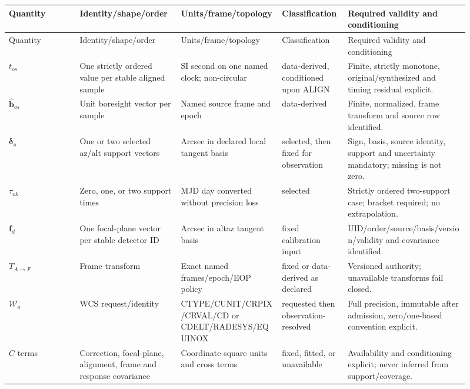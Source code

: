 \documentclass[11pt]{article}
\newcommand{\breakslash}{/\allowbreak}
\begin{document}
\begin{longtable}{L{0.14\linewidth}L{0.20\linewidth}L{0.20\linewidth}L{0.13\linewidth}L{0.24\linewidth}}
\toprule
Quantity & Identity/shape/order & Units/frame/topology & Classification & Required validity and conditioning \\
\midrule
\endfirsthead
\toprule
Quantity & Identity/shape/order & Units/frame/topology & Classification & Required validity and conditioning \\
\midrule
\endhead
$t_{os}$ & One strictly ordered value per stable aligned sample & SI second on one named clock; non-circular & data-derived, conditioned upon ALIGN & Finite, strictly monotone, original/synthesized and timing residual explicit. \\
$\widehat{\boldsymbol b}_{os}$ & Unit boresight vector per sample & Named source frame and epoch & data-derived & Finite, normalized, frame transform and source row identified. \\
$\boldsymbol\delta_o$ & One or two selected az/alt support vectors & Arcsec in declared local tangent basis & selected, then fixed for observation & Sign, basis, source identity, support and uncertainty mandatory; missing is not zero. \\
$\tau_{ok}$ & Zero, one, or two support times & MJD day converted without precision loss & selected & Strictly ordered two-support case; bracket required; no extrapolation. \\
$\boldsymbol f_d$ & One focal-plane vector per stable detector ID & Arcsec in altaz tangent basis & fixed calibration input & UID\breakslash order\breakslash source\breakslash basis\breakslash version\breakslash validity and covariance identified. \\
$T_{A\to F}$ & Frame transform & Exact named frames\breakslash epoch\breakslash EOP policy & fixed or data-derived as declared & Versioned authority; unavailable transforms fail closed. \\
$\mathcal W_o$ & WCS request/identity & CTYPE\breakslash CUNIT\breakslash CRPIX\breakslash CRVAL\breakslash CD or CDELT\breakslash RADESYS\breakslash EQUINOX & requested then observation-resolved & Full precision, immutable after admission, zero/one-based convention explicit. \\
$C$ terms & Correction, focal-plane, alignment, frame and response covariance & Coordinate-square units and cross terms & fixed, fitted, or unavailable & Availability and conditioning explicit; never inferred from support/coverage. \\
\bottomrule
\end{longtable}
\end{document}
